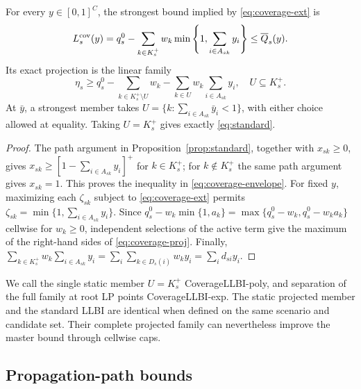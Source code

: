 \begin{proposition}
\label{prop:coverage}
For every $y\in[0,1]^C$, the strongest bound implied by
\eqref{eq:coverage-ext} is
\begin{equation}\label{eq:coverage-envelope}
 L_s^{\rm cov}(y)=q_s^0-
  \sum_{k\in K_s^+}w_k
       \min\left\{1,\sum_{i\in A_{sk}}y_i\right\}
 \le\overline Q_s(y).
\end{equation}
Its exact projection is the linear family
\begin{equation}\label{eq:coverage-proj}
 \eta_s\ge q_s^0-
   \sum_{k\in K_s^+\setminus U}w_k
   -\sum_{k\in U}w_k\sum_{i\in A_{sk}}y_i,
 \quad U\subseteq K_s^+.
\end{equation}
At $\bar y$, a strongest member takes
$U=\{k:\sum_{i\in A_{sk}}\bar y_i<1\}$, with either choice allowed at
equality. Taking $U=K_s^+$ gives exactly \eqref{eq:standard}.
\end{proposition}
\begin{proof}
The path argument in Proposition~\ref{prop:standard}, together with
$x_{sk}\ge0$, gives
$x_{sk}\ge[1-\sum_{i\in A_{sk}}y_i]^+$ for $k\in K_s^+$;
for $k\notin K_s^+$ the same path argument gives $x_{sk}=1$.
This proves the inequality in \eqref{eq:coverage-envelope}.
For fixed $y$, maximizing each $\zeta_{sk}$ subject to
\eqref{eq:coverage-ext} permits
$\zeta_{sk}=\min\{1,\sum_{i\in A_{sk}}y_i\}$.
Since $q_s^0-w_k\min\{1,a_k\}=
\max\{q_s^0-w_k,q_s^0-w_ka_k\}$ cellwise for $w_k\ge0$,
independent selections of the active term give the maximum of the
right-hand sides of \eqref{eq:coverage-proj}. Finally,
$\sum_{k\in K_s^+}w_k\sum_{i\in A_{sk}}y_i
=\sum_i\sum_{k\in D_s(i)}w_ky_i=\sum_i d_{si}y_i$.
\end{proof}

We call the single static member $U=K_s^+$ CoverageLLBI-poly, and
separation of the full family at root LP points CoverageLLBI-exp.
The static projected member and the standard LLBI are identical when
defined on the same scenario and candidate set. Their complete projected
family can nevertheless improve the master bound through cellwise caps.

\subsection{Propagation-path bounds}\label{sec:path}

